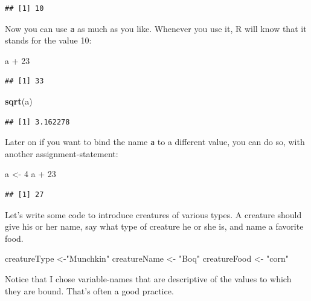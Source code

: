 \documentclass[]{book}
\makeatletter
\newenvironment{Shaded}{\begin{snugshade}}{\end{snugshade}}
\newcommand{\KeywordTok}[1]{\textcolor[rgb]{0.13,0.29,0.53}{\textbf{{#1}}}}
\newcommand{\DecValTok}[1]{\textcolor[rgb]{0.00,0.00,0.81}{{#1}}}
\newcommand{\StringTok}[1]{\textcolor[rgb]{0.31,0.60,0.02}{{#1}}}
\newcommand{\NormalTok}[1]{{#1}}
\newenvironment{kframe}{%
\medskip{}
\setlength{\fboxsep}{.8em}
 \def\at@end@of@kframe{}%
 \ifinner\ifhmode%
  \def\at@end@of@kframe{\end{minipage}}%
  \begin{minipage}{\columnwidth}%
 \fi\fi%
 \def\FrameCommand##1{\hskip\@totalleftmargin \hskip-\fboxsep
 \colorbox{shadecolor}{##1}\hskip-\fboxsep
     \hskip-\linewidth \hskip-\@totalleftmargin \hskip\columnwidth}%
 \MakeFramed {\advance\hsize-\width
   \@totalleftmargin\z@ \linewidth\hsize
   \@setminipage}}%
 {\par\unskip\endMakeFramed%
 \at@end@of@kframe}
\renewenvironment{Shaded}{\begin{kframe}}{\end{kframe}}
\theoremstyle{definition}
\theoremstyle{definition}
\theoremstyle{remark}
\makeatother
\begin{document}
\begin{verbatim}
## [1] 10
\end{verbatim}

Now you can use \texttt{a} as much as you like. Whenever you use it, R
will know that it stands for the value 10:

\begin{Shaded}
\begin{Highlighting}[]
\NormalTok{a +}\StringTok{ }\DecValTok{23}
\end{Highlighting}
\end{Shaded}

\begin{verbatim}
## [1] 33
\end{verbatim}

\begin{Shaded}
\begin{Highlighting}[]
\KeywordTok{sqrt}\NormalTok{(a)}
\end{Highlighting}
\end{Shaded}

\begin{verbatim}
## [1] 3.162278
\end{verbatim}

Later on if you want to bind the name \texttt{a} to a different value,
you can do so, with another assignment-statement:

\begin{Shaded}
\begin{Highlighting}[]
\NormalTok{a <-}\StringTok{ }\DecValTok{4}
\NormalTok{a +}\StringTok{ }\DecValTok{23}
\end{Highlighting}
\end{Shaded}

\begin{verbatim}
## [1] 27
\end{verbatim}

Let's write some code to introduce creatures of various types. A
creature should give his or her name, say what type of creature he or
she is, and name a favorite food.

\begin{Shaded}
\begin{Highlighting}[]
\NormalTok{creatureType <-}\StringTok{"Munchkin"}
\NormalTok{creatureName <-}\StringTok{ "Boq"}
\NormalTok{creatureFood <-}\StringTok{ "corn"}
\end{Highlighting}
\end{Shaded}

Notice that I chose variable-names that are descriptive of the values to
which they are bound. That's often a good practice.
\end{document}
